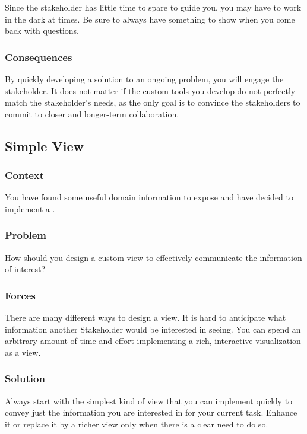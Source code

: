 \documentclass[sigconf]{acmart}
\newcommand{\pattern}[1]{\emph{\nameref{pat:#1}}\xspace}
\begin{document}
Since the stakeholder has little time to spare to guide you, you may have to work in the dark at times.
Be sure to always have something to show when you come back with questions.

\subsubsection*{Consequences}
By quickly developing a solution to an ongoing problem, you will engage the stakeholder.
It does not matter if the custom tools you develop do not perfectly match the stakeholder's needs, as the only goal is to convince the stakeholders to commit to closer and longer-term collaboration.

\subsection*{Simple View}\label{pat:simpleView}
\subsubsection*{Context}
You have found some useful domain information to expose and have decided to implement a \pattern{customView}.

\subsubsection*{Problem}
How should you design a custom view to effectively communicate the information of interest?

\subsubsection*{Forces}
There are many different ways to design a view.
It is hard to anticipate what information another Stakeholder would be interested in seeing.
You can spend an arbitrary amount of time and effort implementing a rich, interactive visualization as a view.

\subsubsection*{Solution}
Always start with the simplest kind of view that you can implement quickly to convey just the information you are interested in for your current task.
Enhance it or replace it by a richer view only when there is a clear need to do so.
\end{document}
